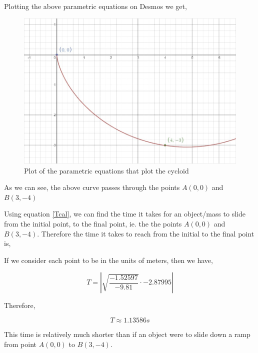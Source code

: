 {Plotting the above parametric equations on Desmos we get,}

\begin{figure}[H]
\centering
\includegraphics[width=15cm]{cycplt.jpg}
    		\caption{{Plot of the parametric equations that plot the cycloid}}
\end{figure}

{As we can see, the above curve passes through the points $A(0,0)$ and $B(3,-4)$}

{Using equation \ref{Tcal}, we can find the time it takes for an object/mass to slide from the initial point, to the final point, ie. the the points $A(0,0)$ and $B(3,-4)$. Therefore the time it takes to reach from the initial to the final point is,}

{If we consider each point to be in the units of meters, then we have,}

	$$T = \left|\sqrt{\frac{-1.52597}{-9.81}}\cdot -2.87995\right|$$

{Therefore,}

	$$T \approx 1.13586 s$$

{This time is relatively much shorter than if an object were to slide down a ramp from point $A(0,0)$ to $B(3,-4)$.}


